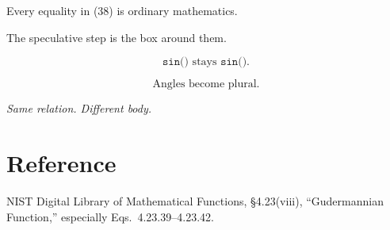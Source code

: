 \documentclass[9pt,twocolumn]{article}
\begin{document}
Every equality in (38) is ordinary mathematics.

The speculative step is the box around them.

\vfill
\begin{center}
\large

$$
\boxed{\texttt{sin()} \text{ stays } \texttt{sin()}.}
$$

$$
\boxed{\text{Angles become plural.}}
$$

\smallskip
\textit{Same relation. Different body.}
\end{center}

\section*{Reference}

\small
NIST Digital Library of Mathematical Functions,
\S4.23(viii), ``Gudermannian Function,'' especially
Eqs.~4.23.39--4.23.42.
\end{document}
